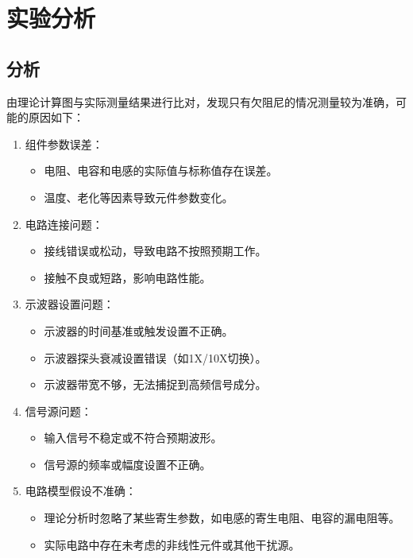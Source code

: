 \documentclass[a4paper,utf8]{article}
\begin{document}
\section{实验分析}
    \subsection{分析}
    由理论计算图与实际测量结果进行比对，发现只有欠阻尼的情况测量较为准确，可能的原因如下：
    \begin{enumerate}
        \item 组件参数误差：
        \begin{itemize}
        \item 电阻、电容和电感的实际值与标称值存在误差。
        \item 温度、老化等因素导致元件参数变化。
        \end{itemize}
        
        \item 电路连接问题：
        \begin{itemize}
        \item 接线错误或松动，导致电路不按照预期工作。
        \item 接触不良或短路，影响电路性能。
        \end{itemize}
        
        \item 示波器设置问题：
        \begin{itemize}
        \item 示波器的时间基准或触发设置不正确。
        \item 示波器探头衰减设置错误（如1X/10X切换）。
        \item 示波器带宽不够，无法捕捉到高频信号成分。
        \end{itemize}
        
        \item 信号源问题：
        \begin{itemize}
        \item 输入信号不稳定或不符合预期波形。
        \item 信号源的频率或幅度设置不正确。
        \end{itemize}
        
        \item 电路模型假设不准确：
        \begin{itemize}
        \item 理论分析时忽略了某些寄生参数，如电感的寄生电阻、电容的漏电阻等。
        \item 实际电路中存在未考虑的非线性元件或其他干扰源。
        \end{itemize}
        

\end{enumerate}
\end{document}
